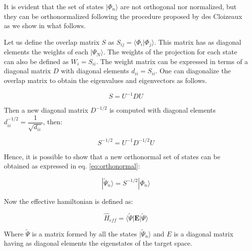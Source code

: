 \documentclass[12pt,twoside]{report}
\begin{document}
	It is evident that the set of states $|\Phi_n\rangle$ are not orthogonal nor
	normalized, but they can be orthonormalized following the procedure proposed
	by  des Cloizeaux \cite{Cloizeaux} as we show in what follows.

	Let us define the overlap matrix $S$ as $S_{ij} = \langle \Phi_i |
	\Phi_j\rangle$.  This matrix has as diagonal elements the weights of each
	$|\Psi_N\rangle$.  The weights of the projection for each state can also be
	defined as  $W_i=S_{ii}$.  The weight matrix can be expressed in terms of a
	diagonal matrix $D$ with diagonal elements $d_{ii} = S_{ii}$. One can
	diagonalize the overlap matrix to obtain the eigenvalues and eigenvectors as
	follows.

	\begin{equation}
	    S=U^{-1}DU
	\end{equation}

	Then a new diagonal matrix $D^{-1\slash 2}$ is computed with diagonal
	elements $d^{-1\slash 2}_{ii}=\dfrac{1}{\sqrt{d_{ii}}}$, then:

	\begin{equation}
	   S^{-1\slash 2}=U^{-1}D^{-1\slash 2}U 
	\end{equation}

	Hence, it is possible to show that a new orthonormal set of states can be
	obtained as expressed in eq. \ref{eq:orthonormal}:

	\begin{equation}
	   |\tilde{\Psi}_n \rangle=S^{-1 \slash 2}|\Phi_n \rangle
	   \label{eq:orthonormal}
	\end{equation}

	Now the effective hamiltonian is defined as:

	\begin{equation}
	    \hat{H}_{eff}=\langle \tilde{\Psi} | \mathbf{E} | \tilde{\Psi} \rangle
	\end{equation}

	Where $\tilde{\Psi}$ is a matrix formed by all the states $|\tilde{\Psi}_n\rangle$ and $E$ is a
	diagonal matrix having as diagonal elements the eigenstates of the target
	space.

	
\end{document}
